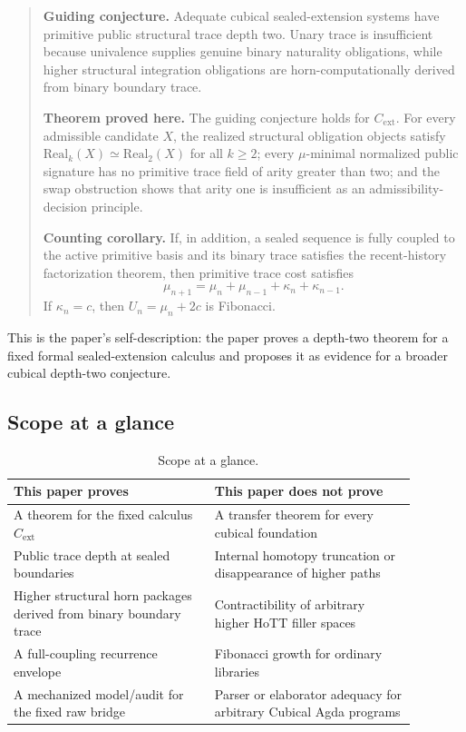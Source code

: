 \documentclass{lmcs}
\newcommand{\Real}{\mathrm{Real}}
\newcommand{\Cext}{C_{\mathrm{ext}}}
\begin{document}
\begin{quote}
\textbf{Guiding conjecture.}
Adequate cubical sealed-extension systems have primitive public structural trace depth two. Unary trace is insufficient because univalence supplies genuine binary naturality obligations, while higher structural integration obligations are horn-computationally derived from binary boundary trace.

\textbf{Theorem proved here.}
The guiding conjecture holds for $\Cext$. For every admissible candidate $X$, the realized structural obligation objects satisfy $\Real_k(X)\simeq\Real_2(X)$ for all $k\geq2$; every $\mu$-minimal normalized public signature has no primitive trace field of arity greater than two; and the swap obstruction shows that arity one is insufficient as an admissibility-decision principle.

\textbf{Counting corollary.}
If, in addition, a sealed sequence is fully coupled to the active primitive basis and its binary trace satisfies the recent-history factorization theorem, then primitive trace cost satisfies
\[
  \mu_{n+1} = \mu_n + \mu_{n-1} + \kappa_n + \kappa_{n-1}.
\]
If $\kappa_n=c$, then $U_n=\mu_n+2c$ is Fibonacci.
\end{quote}

This is the paper's self-description: the paper proves a depth-two theorem for a fixed formal sealed-extension calculus and proposes it as evidence for a broader cubical depth-two conjecture.

\subsection{Scope at a glance}

\begin{table}[t]
\centering
\caption{Scope at a glance.}
\label{tab:scope-at-glance}
\small
\begin{tabular}{@{}p{0.44\linewidth}p{0.44\linewidth}@{}}
\toprule
This paper proves & This paper does not prove \\
\midrule
A theorem for the fixed calculus $\Cext$ & A transfer theorem for every cubical foundation \\
Public trace depth at sealed boundaries & Internal homotopy truncation or disappearance of higher paths \\
Higher structural horn packages derived from binary boundary trace & Contractibility of arbitrary higher HoTT filler spaces \\
A full-coupling recurrence envelope & Fibonacci growth for ordinary libraries \\
A mechanized model/audit for the fixed raw bridge & Parser or elaborator adequacy for arbitrary Cubical Agda programs \\
\bottomrule
\end{tabular}
\end{table}
\end{document}
